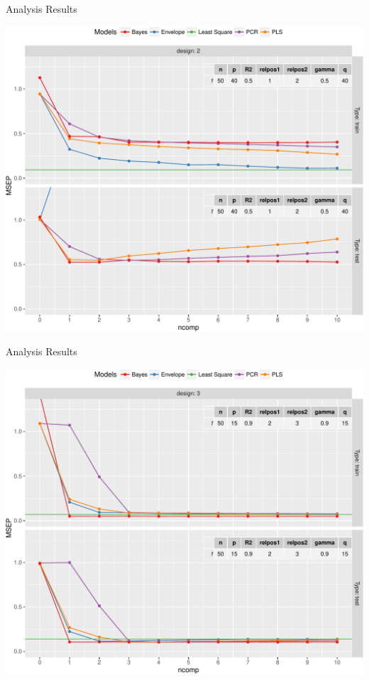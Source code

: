 \documentclass[ignorenonframetext,]{beamer}
\begin{document}
\begin{frame}{Analysis Results}

\begin{center}\includegraphics{Main_files/figure-beamer/unnamed-chunk-7-1} \end{center}

\end{frame}

\begin{frame}{Analysis Results}

\begin{center}\includegraphics{Main_files/figure-beamer/unnamed-chunk-8-1} \end{center}

\end{frame}
\end{document}
